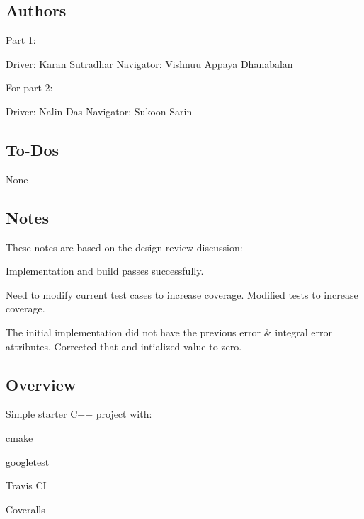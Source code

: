 \href{https://travis-ci.org/Karansutradhar/pid-controller-B}{\tt } \href{https://coveralls.io/github/Karansutradhar/pid-controller-B?branch=master}{\tt }

\subsection*{Authors}

Part 1\+: \begin{DoxyVerb}Driver: Karan Sutradhar
Navigator: Vishnuu Appaya Dhanabalan
\end{DoxyVerb}


For part 2\+: \begin{DoxyVerb}Driver: Nalin Das
Navigator: Sukoon Sarin
\end{DoxyVerb}


\subsection*{To-\/\+Do\textquotesingle{}s}

None

\subsection*{Notes}

These notes are based on the design review discussion\+:
\begin{DoxyEnumerate}
\item Implementation and build passes successfully.
\item Need to modify current test cases to increase coverage. Modified tests to increase coverage.
\item The initial implementation did not have the previous error \& integral error attributes. Corrected that and intialized value to zero.
\end{DoxyEnumerate}

\subsection*{Overview}

Simple starter C++ project with\+:


\begin{DoxyItemize}
\item cmake
\item googletest
\item Travis CI
\item Coveralls
\end{DoxyItemize}

